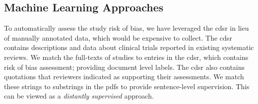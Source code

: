 \documentclass[runningheads,a4paper]{llncs}
\begin{document}



\subsection{Machine Learning Approaches}
To automatically assess the study risk of bias, we have leveraged the \ac{cdsr} in lieu of manually annotated data, which would be expensive to collect.
The \ac{cdsr} contains descriptions and data about clinical trials reported in existing systematic reviews.
We match the full-texts of studies to entries in the \ac{cdsr}, which contains risk of bias assessment; providing document level labels.
The \ac{cdsr} also contains quotations that reviewers indicated as supporting their assessments.
We match these strings to substrings in the \acp{pdf} to provide sentence-level supervision.
This can be viewed as a \emph{distantly supervised} \cite{Mintz09,Nguyen11} approach.
\end{document}
